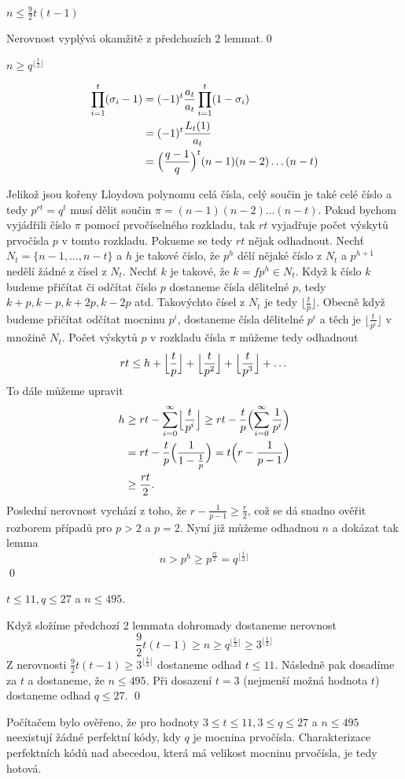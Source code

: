 \lm $n \leq \frac{9}{2} t(t-1)$

\dk Nerovnost vyplývá okamžitě z předchozích 2 lemmat.\qed

\lm $n \geq q^{\lfloor \frac{t}{2} \rfloor}$

\dk
\begin{align*}
\prod\limits_{i = 1}^t (\sigma_i - 1) &= (-1)^t \frac{a_t}{a_t} \prod\limits_{i = 1}^t (1 - \sigma_i) \\
&= (-1)^t \frac{L_t(1)}{a_t} \\
&= \Bigl(\frac{q-1}{q}\Bigr)^t (n-1)(n-2)\dots(n-t)
\end{align*}

Jelikož jsou kořeny Lloydova polynomu celá čísla, celý součin je také celé číslo a tedy $p^{rt} = q^t$ musí dělit součin $\pi = (n-1)(n-2)\dots(n-t)$. Pokud bychom vyjádřili číslo $\pi$ pomocí prvočíselného rozkladu, tak $rt$ vyjadřuje počet výskytů prvočísla $p$ v tomto rozkladu. Pokusme se tedy $rt$ nějak odhadnout. Nechť $ N_t = \{n-1,\dots,n-t\}$ a $h$ je takové číslo, že $p^h$ dělí nějaké číslo z $N_t$ a $p^{h+1}$ nedělí žádné z čísel z $N_t$. Nechť $k$ je takové, že $k = fp^h \in N_t$. Když k číslo $k$ budeme přičítat či odčítat číslo $p$ dostaneme čísla dělitelné $p$, tedy $k + p, k - p, k + 2p, k - 2p$ atd. Takovýchto čísel z $N_t$ je tedy $\lfloor \frac{t}{p} \rfloor$. Obecně když budeme přičítat odčítat mocninu $p^i$, dostaneme čísla dělitelné $p^i$ a těch je $\lfloor \frac{t}{p^i} \rfloor$ v množině $N_t$. Počet výskytů $p$ v rozkladu čísla $\pi$ můžeme tedy odhadnout
\[
rt \leq h + \Bigl\lfloor \frac{t}{p} \Bigr\rfloor + \Bigl\lfloor \frac{t}{p^2} \Bigr\rfloor + \Bigl\lfloor \frac{t}{p^3} \Bigr\rfloor + \dots
\]
To dále můžeme upravit
\begin{align*}
h &\geq rt - \sum\limits_{i=0}^\infty \Bigl\lfloor \frac{t}{p^i} \Bigr\rfloor 
 \geq rt - \frac{t}{p} \Bigl(\sum\limits_{i=0}^\infty  \frac{1}{p^i} \Bigr) \\
& = rt - \frac{t}{p}\Bigl(\frac{1}{1-\frac{1}{p}}\Bigr) 
= t \Bigl(r - \frac{1}{p-1} \Bigr) \\
& \geq \frac{rt}{2}.
\end{align*}
Poslední nerovnost vychází z toho, že $r - \frac{1}{p-1} \geq \frac{r}{2}$, což se dá snadno ověřit rozborem případů pro $p > 2$ a $p = 2$. Nyní již můžeme odhadnou $n$ a dokázat tak lemma
\[
n > p^h \geq p^{\frac{rt}{2}} = q^{\lfloor\frac{t}{2}\rfloor}
\]
\qed

\lm $t \leq 11, q \leq 27$ a $n \leq 495$.

\dk Když složíme předchozí 2 lemmata dohromady dostaneme nerovnost
\[
\frac{9}{2}t(t-1) \geq n \geq q^{\lfloor\frac{t}{2}\rfloor} \geq 3^{\lfloor\frac{t}{2}\rfloor}
\]
Z nerovnosti $\frac{9}{2}t(t-1) \geq 3^{\lfloor\frac{t}{2}\rfloor}$ dostaneme odhad $t \leq 11$. Následně pak dosadíme za $t$ a dostaneme, že $n \leq 495$. Při dosazení $t=3$ (nejmenší možná hodnota $t$) dostaneme odhad $q \leq 27$. \qed

Počítačem bylo ověřeno, že pro hodnoty $3 \leq t \leq 11, 3 \leq q \leq 27$ a $n \leq 495$ neexistují žádné perfektní kódy, kdy $q$ je mocnina prvočísla. Charakterizace perfektních kódů nad abecedou, která má velikost mocninu prvočísla, je tedy hotová.